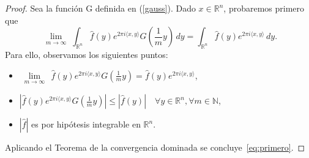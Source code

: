 \begin{proof}
Sea la función G definida en (\ref{gauss}). Dado $x \in \mathbb{R}^n$, probaremos primero que 
\begin{equation}\label{eq:primero}
   \underset{\substack{m \rightarrow \infty}}{\lim}\int_{\mathbb{R}^n}\widehat{f}(y)e^{2\pi i \langle x, y \rangle}G\left(\frac{1}{m}y\right) \, dy = \int_{\mathbb{R}^n}\widehat{f}(y)e^{2\pi i \langle x, y \rangle} \, dy .
\end{equation}
Para ello, observamos los siguientes puntos:
\begin{itemize}
    \item $\underset{\substack{m \rightarrow \infty}}{\lim}\, \widehat{f}(y)e^{2\pi i \langle x, y \rangle}G\left(\frac{1}{m}y\right)  = \widehat{f}(y)e^{2\pi i \langle x, y \rangle}$,
    \item $|\widehat{f}(y)e^{2\pi i \langle x, y \rangle}G\left(\frac{1}{m}y\right)| \leq |\widehat{f}(y)| \quad \forall y \in \mathbb{R}^n, \forall m \in \mathbb{N}$,
    \item $|\widehat{f}|$ es por hipótesis integrable en $\mathbb{R}^n$.
\end{itemize}

\noindent Aplicando el Teorema de la convergencia dominada se concluye~\eqref{eq:primero}.


\end{proof}

